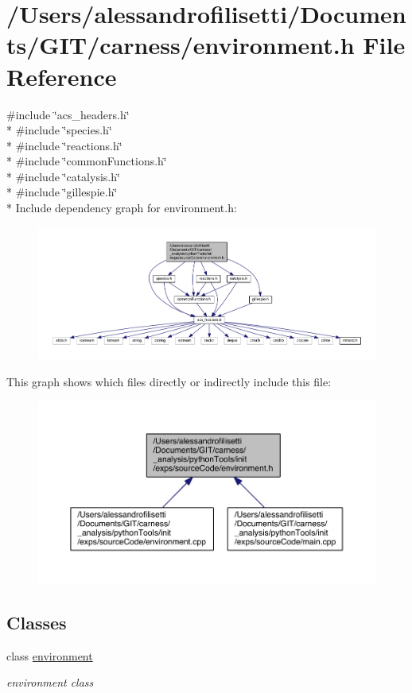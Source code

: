 \hypertarget{a00063}{\section{/\-Users/alessandrofilisetti/\-Documents/\-G\-I\-T/carness/environment.h File Reference}
\label{a00063}
}
{\ttfamily \#include \char`\"{}acs\-\_\-headers.\-h\char`\"{}}\\*
{\ttfamily \#include \char`\"{}species.\-h\char`\"{}}\\*
{\ttfamily \#include \char`\"{}reactions.\-h\char`\"{}}\\*
{\ttfamily \#include \char`\"{}common\-Functions.\-h\char`\"{}}\\*
{\ttfamily \#include \char`\"{}catalysis.\-h\char`\"{}}\\*
{\ttfamily \#include \char`\"{}gillespie.\-h\char`\"{}}\\*
Include dependency graph for environment.\-h\-:
\nopagebreak
\begin{figure}[H]
\begin{center}
\leavevmode
\includegraphics[width=350pt]{a00180}
\end{center}
\end{figure}
This graph shows which files directly or indirectly include this file\-:
\nopagebreak
\begin{figure}[H]
\begin{center}
\leavevmode
\includegraphics[width=350pt]{a00181}
\end{center}
\end{figure}
\subsection*{Classes}
\begin{DoxyCompactItemize}
\item 
class \hyperlink{a00014}{environment}
\begin{DoxyCompactList}\small\item\em environment class \end{DoxyCompactList}\end{DoxyCompactItemize}
